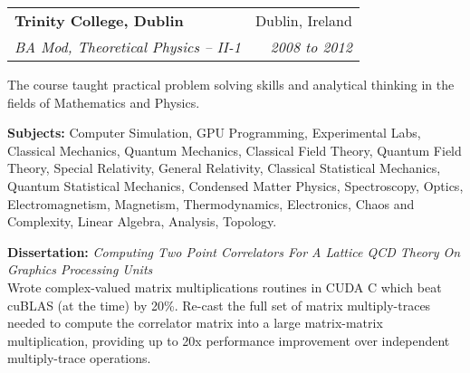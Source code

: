 \documentclass[11pt]{article}
\makeatletter
\newenvironment{resumeSubSectionHeader}{
    \par
    \begin{tabular*}{\textwidth}{l@{\extracolsep{\fill}}r}
    \par
} {
    \end{tabular*}
    \par
}
\newenvironment{resumeSubSectionBody}{
    \par
    \vspace{-0.4\parskip}
    \begin{small}
    \par
} {
    \par
    \end{small}
    \par
}
\newenvironment{resumeDescription}{
    \vspace{-0.5\baselineskip}
    \begin{description}
} {
    \end{description}
}
\makeatother
\begin{document}
%
%
\begin{resumeSubSectionHeader}

    \textbf{Trinity College, Dublin}   & Dublin, Ireland     \\
    \emph{BA Mod, Theoretical Physics -- II-1} & \emph{2008 to 2012}

\end{resumeSubSectionHeader}
\begin{resumeSubSectionBody}

    The course taught practical problem solving skills and analytical thinking
    in the fields of Mathematics and Physics.

    \begin{resumeDescription}
        \item{\bf Subjects:}
            Computer Simulation, GPU Programming,
            Experimental Labs,
            Classical Mechanics, Quantum Mechanics,
            Classical Field Theory, Quantum Field Theory,
            Special Relativity, General Relativity,
            Classical Statistical Mechanics, Quantum Statistical Mechanics,
            Condensed Matter Physics, Spectroscopy,
            Optics, Electromagnetism, Magnetism, Thermodynamics,
            Electronics, Chaos and Complexity,
            Linear Algebra, Analysis,
            Topology.

        \item{
            {\bf Dissertation:}
            \it Computing Two Point Correlators For A Lattice QCD Theory On
            Graphics Processing Units
        } \\
            Wrote complex-valued matrix multiplications routines in CUDA C which
            beat cuBLAS (at the time) by 20\%.
            Re-cast the full set of matrix multiply-traces needed to compute the
            correlator matrix into a large matrix-matrix multiplication,
            providing up to 20x performance improvement over independent
            multiply-trace operations.
    \end{resumeDescription}

\end{resumeSubSectionBody}




\end{document}
